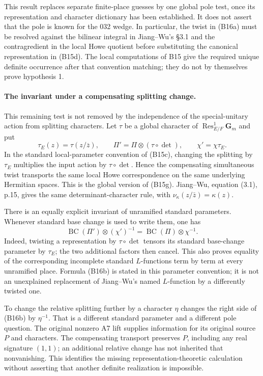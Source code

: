 \documentclass[11pt]{article}
\theoremstyle{definition}\newtheorem{definition}[theorem]{Definition}\newtheorem{remark}[theorem]{Remark}
\begin{document}
This result replaces separate finite-place guesses by one global pole test, once its representation and character dictionary has been established. It does not assert that the pole is known for the 032 wedge. In particular, the twist in (B16a) must be resolved against the bilinear integral in Jiang--Wu's \S3.1 and the contragredient in the local Howe quotient before substituting the canonical representation in (B15d). The local computations of B15 give the required unique definite occurrence after that convention matching; they do not by themselves prove hypothesis 1.

\paragraph{The invariant under a compensating splitting change.}
This remaining test is not removed by the independence of the special-unitary action from splitting characters. Let $\tau$ be a global character of $\operatorname{Res}^{1}_{E/F}\mathbf G_m$ and put
\[
 \tau_E(z)=\tau(z/\overline z),\qquad
 \Pi'=\Pi\otimes(\tau\circ\det),\qquad
 \chi'=\chi\tau_E.
\]
In the standard local-parameter convention of (B15c), changing the splitting by $\tau_E$ multiplies the input action by $\tau\circ\det$. Hence the compensating simultaneous twist transports the same local Howe correspondence on the same underlying Hermitian spaces. This is the global version of (B15g). Jiang--Wu, equation (3.1), p.15, gives the same determinant-character rule, with $\nu_\kappa(z/\bar z)=\kappa(z)$.

There is an equally explicit invariant of unramified standard parameters. Whenever standard base change is used to write them, one has
\[
 \operatorname{BC}(\Pi')\otimes(\chi')^{-1}
   =\operatorname{BC}(\Pi)\otimes\chi^{-1}.
 \tag{B16b}
\]
Indeed, twisting a representation by $\tau\circ\det$ tensors its standard base-change parameter by $\tau_E$; the two additional factors then cancel. This also proves equality of the corresponding incomplete standard $L$-functions term by term at every unramified place. Formula (B16b) is stated in this parameter convention; it is not an unexplained replacement of Jiang--Wu's named $L$-function by a differently twisted one.

To change the relative splitting further by a character $\eta$ changes the right side of (B16b) by $\eta^{-1}$. That is a different standard parameter and a different pole question. The original nonzero A7 lift supplies information for its original source $P$ and characters. The compensating transport preserves $P$, including any real signature $(1,1)$; an additional relative change has not inherited that nonvanishing. This identifies the missing representation-theoretic calculation without asserting that another definite realization is impossible.
\end{document}
